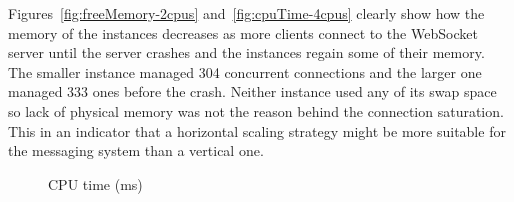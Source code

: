 \noindent
Figures~\ref{fig:freeMemory-2cpus} and~\ref{fig:cpuTime-4cpus} clearly show how the memory of the instances decreases as more clients connect to the WebSocket server until the server crashes and the instances regain some of their memory. The smaller instance managed 304 concurrent connections and the larger one managed 333 ones before the crash. Neither instance used any of its swap space so lack of physical memory was not the reason behind the connection saturation. This in an indicator that a horizontal scaling strategy might be more suitable for the messaging system than a vertical one.
\\
\begin{figure}[h!]
	\centering
	 \hfill
	\caption{CPU time  (ms)}
\end{figure}


